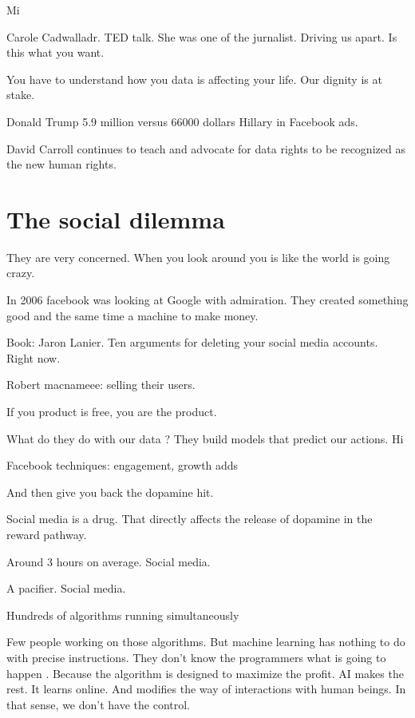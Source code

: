   
  
   Mi
  
  
  
  Carole Cadwalladr. TED talk. She was one of the jurnalist. Driving us apart. Is this what you want. 
  
  You have to understand how you data is affecting your life. Our dignity is at stake. 
  
  Donald Trump 5.9 million versus 66000 dollars Hillary in Facebook ads. 
  
  David Carroll continues to teach and advocate for data rights to be recognized as the new human rights. 
  
  
 
       
 \section{The social dilemma}
 They are very concerned. 
 When you look around you is like the world is going crazy. 
 
 In 2006 facebook was looking at Google with admiration. They created something good and the same time a machine to make money. 
 
 Book: Jaron Lanier. Ten arguments for deleting your social media accounts. Right now. 
 
 Robert macnameee: selling their users. 
 
 If you  product is free, you are the product. 
 
 What do they do with our data ? 
 They build models that predict our actions. Hi
 
 Facebook techniques: engagement, growth adds
 
 And then give you back the dopamine hit. 
 
 Social media is a drug. That directly affects the release of dopamine in the reward pathway. 
 
 Around 3 hours on average. Social media. 
 
 A pacifier. Social media. 
 
 Hundreds of algorithms running simultaneously 
 
 Few people working on those algorithms. But machine learning has nothing to do with precise  instructions. They don't know the programmers 
 what is going to happen . Because the algorithm is designed to maximize the profit. AI makes the rest. It learns online. And modifies the 
 way of interactions with human beings. In that sense, we don't have the control. 
 
